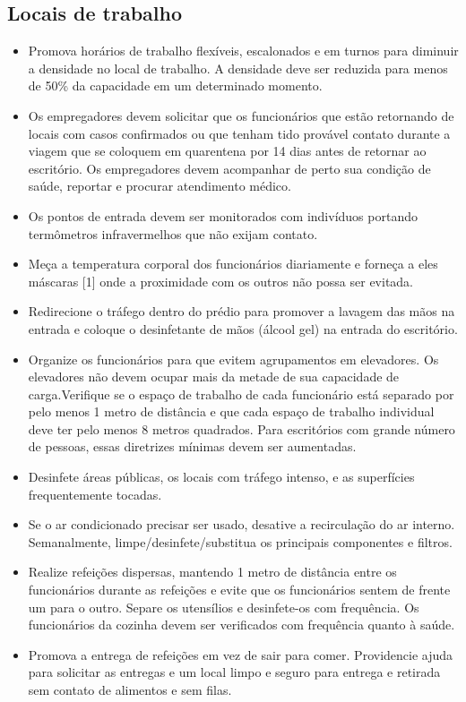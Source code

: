 \documentclass[onecolumn,journal]{IEEEtran}
\begin{document}
\begin{multicols}{2}
\section*{Locais de trabalho}
\begin{itemize}
\item Promova horários de trabalho flexíveis, escalonados e em turnos para diminuir a densidade no local de trabalho. A densidade deve ser reduzida para menos de 50\% da capacidade em um determinado momento.
\item Os empregadores devem solicitar que os funcionários que estão retornando de locais com casos confirmados ou que tenham tido provável contato durante a viagem que se coloquem em quarentena por 14 dias antes de retornar ao escritório. Os empregadores devem acompanhar de perto sua condição de saúde, reportar e procurar atendimento médico.
\item Os pontos de entrada devem ser monitorados com indivíduos portando termômetros infravermelhos que não exijam contato.
\item Meça a temperatura corporal dos funcionários diariamente e forneça a eles máscaras [1] onde a proximidade com os outros não possa ser evitada.
\item Redirecione o tráfego dentro do prédio para promover a lavagem das mãos na entrada e coloque o desinfetante de mãos (álcool gel) na entrada do escritório.
\item Organize os funcionários para que evitem agrupamentos em elevadores. Os elevadores não devem ocupar mais da metade de sua capacidade de carga.Verifique se o espaço de trabalho de cada funcionário está separado por pelo menos 1 metro de distância e que cada espaço de trabalho individual deve ter pelo menos 8 metros quadrados. Para escritórios com grande número de pessoas, essas diretrizes mínimas devem ser aumentadas.
\item Desinfete áreas públicas, os locais com tráfego intenso, e as superfícies frequentemente tocadas.
\item Se o ar condicionado precisar ser usado, desative a recirculação do ar interno. Semanalmente, limpe/desinfete/substitua os principais componentes e filtros.
\item Realize refeições dispersas, mantendo 1 metro de distância entre os funcionários durante as refeições e evite que os funcionários sentem de frente um para o outro. Separe os utensílios e desinfete-os com frequência. Os funcionários da cozinha devem ser verificados com frequência quanto à saúde.
\item Promova a entrega de refeições em vez de sair para comer. Providencie ajuda para solicitar as entregas e um local limpo e seguro para entrega e retirada sem contato de alimentos e sem filas.

\end{itemize}
\end{multicols}
\end{document}
